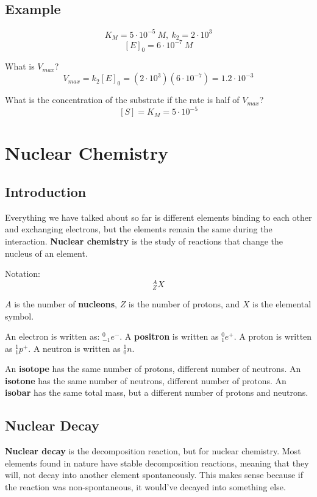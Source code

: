 \documentclass{article}
\begin{document}
\subsection{Example}

$$  K_{M} = 5 \cdot 10^{-5}\ \si{ M },\ k_{2} = 2 \cdot 10^{3} $$
$$ [E]_{0} = 6 \cdot 10^{-7}\ \si{ M } $$

What is $V_{max}$?
$$ V_{max} = k_{2}[E]_{0} = (2 \cdot 10^{3})(6 \cdot 10^{-7}) = 1.2 \cdot 10^{-3} $$

What is the concentration of the substrate if the rate is half of $V_{max}$?
$$ [S] = K_{M} = 5 \cdot 10^{-5} $$

\section{Nuclear Chemistry}

\subsection{Introduction}

Everything we have talked about so far is different elements binding to each
other and exchanging electrons, but the elements remain the same during the
interaction. \textbf{Nuclear chemistry} is the study of reactions that change
the nucleus of an element.

Notation:
$$ {}^{A}_{Z}X $$

$A$ is the number of \textbf{nucleons}, $Z$ is the number of protons, and $X$ is
the elemental symbol.

An electron is written as: ${}_{-1}^{0}e^{-}$. A \textbf{positron} is written as
${}_{1}^{0}e^{+}$. A proton is written as ${}_{1}^{1}p^{+}$. A neutron is
written as ${}_{0}^{1}n$.

An \textbf{isotope} has the same number of protons, different number of
neutrons. An \textbf{isotone} has the same number of neutrons, different number
of protons. An \textbf{isobar} has the same total mass, but a different number
of protons and neutrons.

\subsection{Nuclear Decay}

\textbf{Nuclear decay} is the decomposition reaction, but for nuclear chemistry.
Most elements found in nature have stable decomposition reactions, meaning that
they will, not decay into another element spontaneously. This makes sense
because if the reaction was non-spontaneous, it would've decayed into something
else.
\end{document}
